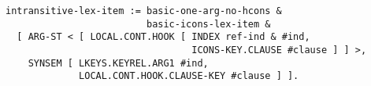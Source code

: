 \documentclass[a4paper]{article}
\begin{document}
{\small\begin{verbatim}
intransitive-lex-item := basic-one-arg-no-hcons & 
                         basic-icons-lex-item &
  [ ARG-ST < [ LOCAL.CONT.HOOK [ INDEX ref-ind & #ind,
                                 ICONS-KEY.CLAUSE #clause ] ] >,
    SYNSEM [ LKEYS.KEYREL.ARG1 #ind,
             LOCAL.CONT.HOOK.CLAUSE-KEY #clause ] ].
\end{verbatim}}
\end{document}
